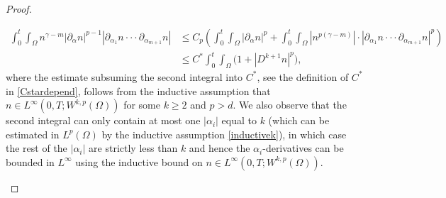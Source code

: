 \documentclass[12pt]{article}
\theoremstyle{plain}
\begin{document}
\begin{proof}
\begin{itemize}
\begin{align}\label{lotest}
\int_{0}^{t} \int_{\Omega} n^{\gamma - m} |\partial_{\alpha}n|^{p - 1} |\partial_{\alpha_{1}}n \cdot \cdot \cdot \partial_{\alpha_{m+1}}n| &\le C_{p}\left(\int_{0}^{t} \int_{\Omega} |\partial_{\alpha}n|^{p} + \int_{0}^{t} \int_{\Omega} |n^{p(\gamma - m)}| \cdot  |\partial_{\alpha_{1}}n \cdot \cdot \cdot \partial_{\alpha_{m+1}}n|^{p}\right) \nonumber \\
&\le C^{*}\int_{0}^{t} \int_{\Omega} \Big(1 + |D^{k+1}n|^{p}\Big),
\end{align}
where the estimate subsuming the second integral into $C^{*}$, see the definition of $C^{*}$ in \eqref{Cstardepend}, follows from the inductive assumption that $n \in L^{\infty}(0, T; W^{k, p}(\Omega))$ for some $k \ge 2$ and $p > d$. We also observe that the second integral can only contain at most one $|\alpha_{i}|$ equal to $k$ (which can be estimated in $L^{p}(\Omega)$ by the inductive assumption \eqref{inductivek}), in which case the rest of the $|\alpha_{i}|$ are strictly less than $k$ and hence the $\alpha_{i}$-derivatives can be bounded in $L^{\infty}$ using the inductive bound on $n \in L^{\infty}(0, T; W^{k, p}(\Omega))$.


\end{itemize}
\end{proof}
\end{document}
